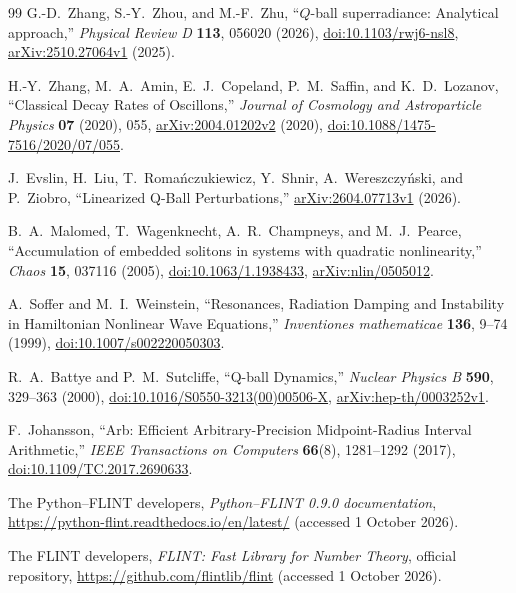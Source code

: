 \begin{thebibliography}{99}
G.-D.~Zhang, S.-Y.~Zhou, and M.-F.~Zhu,
``$Q$-ball superradiance: Analytical approach,''
\emph{Physical Review D} \textbf{113}, 056020 (2026),
\href{https://doi.org/10.1103/rwj6-nsl8}{doi:10.1103/rwj6-nsl8},
\href{https://arxiv.org/abs/2510.27064v1}{arXiv:2510.27064v1} (2025).

H.-Y.~Zhang, M.~A.~Amin, E.~J.~Copeland, P.~M.~Saffin, and K.~D.~Lozanov,
``Classical Decay Rates of Oscillons,''
\emph{Journal of Cosmology and Astroparticle Physics} \textbf{07} (2020), 055,
\href{https://arxiv.org/abs/2004.01202v2}{arXiv:2004.01202v2} (2020),
\href{https://doi.org/10.1088/1475-7516/2020/07/055}{doi:10.1088/1475-7516/2020/07/055}.

J.~Evslin, H.~Liu, T.~Roma\'nczukiewicz, Y.~Shnir,
A.~Wereszczy\'nski, and P.~Ziobro,
``Linearized Q-Ball Perturbations,''
\href{https://arxiv.org/abs/2604.07713v1}{arXiv:2604.07713v1} (2026).

B.~A.~Malomed, T.~Wagenknecht, A.~R.~Champneys, and M.~J.~Pearce,
``Accumulation of embedded solitons in systems with quadratic nonlinearity,''
\emph{Chaos} \textbf{15}, 037116 (2005),
\href{https://doi.org/10.1063/1.1938433}{doi:10.1063/1.1938433},
\href{https://arxiv.org/abs/nlin/0505012}{arXiv:nlin/0505012}.

A.~Soffer and M.~I.~Weinstein,
``Resonances, Radiation Damping and Instability in Hamiltonian Nonlinear Wave Equations,''
\emph{Inventiones mathematicae} \textbf{136}, 9--74 (1999),
\href{https://doi.org/10.1007/s002220050303}{doi:10.1007/s002220050303}.

R.~A.~Battye and P.~M.~Sutcliffe,
``Q-ball Dynamics,'' \emph{Nuclear Physics B} \textbf{590}, 329--363 (2000),
\href{https://doi.org/10.1016/S0550-3213(00)00506-X}{doi:10.1016/S0550-3213(00)00506-X},
\href{https://arxiv.org/abs/hep-th/0003252v1}{arXiv:hep-th/0003252v1}.

F.~Johansson, ``Arb: Efficient Arbitrary-Precision Midpoint-Radius
Interval Arithmetic,'' \emph{IEEE Transactions on Computers}
\textbf{66}(8), 1281--1292 (2017),
\href{https://doi.org/10.1109/TC.2017.2690633}{doi:10.1109/TC.2017.2690633}.

The Python--FLINT developers, \emph{Python--FLINT 0.9.0 documentation},
\url{https://python-flint.readthedocs.io/en/latest/}
(accessed 1 October 2026).

The FLINT developers, \emph{FLINT: Fast Library for Number Theory},
official repository, \url{https://github.com/flintlib/flint}
(accessed 1 October 2026).


\end{thebibliography}
